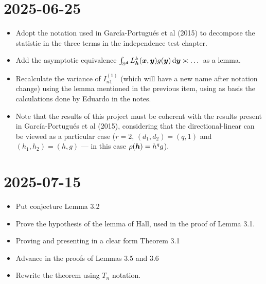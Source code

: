 \documentclass{article}
\begin{document}
\section*{2025-06-25}
\begin{itemize}
    \item [$\checkmark$] Adopt the notation used in García-Portugués et al (2015) to decompose the statistic in the three terms in the independence test chapter.
    \item [$\checkmark$] Add the asymptotic equivalence $\int_{\mathbb{S}^{\boldsymbol{d}}} L_{{\boldsymbol{h}}}^k(\boldsymbol{x},\boldsymbol{y}) g(\boldsymbol{y})\,\mathrm{d}\boldsymbol{y}\asymp  \dots$ as a lemma.
    \item [$\checkmark$] Recalculate the variance of $I_{n1}^{(1)}$ (which will have a new name after notation change) using the lemma mentioned in the previous item, using as basis the calculations done by Eduardo in the notes.
    \item [$\checkmark$] Note that the results of this project must be coherent with the results present in García-Portugués et al (2015), considering that the directional-linear can be viewed as a particular case ($r=2$, $(d_1,d_2)=(q, 1)$ and $(h_1,h_2)=(h,g)$ --- in this case $\rho({\boldsymbol{h}})=h^q g$).
\end{itemize}

\section*{2025-07-15}

\begin{itemize}
    \item [$\checkmark$] Put conjecture Lemma 3.2
    \item [$\checkmark$] Prove the hypothesis of the lemma of Hall, used in the proof of Lemma 3.1.
    \item Proving and presenting in a clear form Theorem 3.1
    \item Advance in the proofs of Lemmas 3.5 and 3.6
    \item [$\checkmark$] Rewrite the theorem using $T_n$ notation.
\end{itemize}
\end{document}
